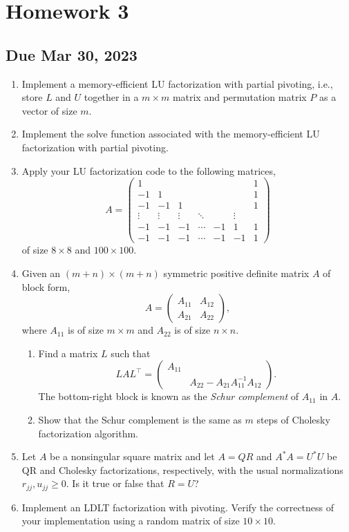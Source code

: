 \section{Homework 3}
\subsection*{Due Mar 30, 2023}
\begin{enumerate}[label=\textbf{Problem \arabic*.}]
    \item [20 pt] Implement a memory-efficient LU factorization with partial pivoting, i.e., store \(L\) and \(U\) together in a \(m\times m\) matrix and permutation matrix \(P\) as a vector of size \(m\).
    \item [10 pt] Implement the solve function associated with the memory-efficient LU factorization with partial pivoting.
    \item [5 pt] Apply your LU factorization code to the following matrices,
    \[A=\begin{pmatrix}1&&&&&&1\\ -1&1&&&&&1\\ -1&-1&1&&&&1\\ \vdots&\vdots&\vdots&\ddots&&\vdots\\ -1&-1&-1&\cdots&-1&1&1\\ -1&-1&-1&\cdots&-1&-1&1\end{pmatrix}\]
    of size \(8\times 8\) and \(100\times 100\).
    \item [20 pt] Given an \((m+n)\times(m+n)\) symmetric positive definite matrix \(A\) of block form,
    \[A=\begin{pmatrix}A_{11}&A_{12}\\ A_{21}&A_{22}\end{pmatrix},\]
    where \(A_{11}\) is of size \(m\times m\) and \(A_{22}\) is of size \(n\times n\).
    \begin{enumerate}
        \item Find a matrix \(L\) such that
        \[LAL^{\top}=\begin{pmatrix}A_{11}&\\ &A_{22}-A_{21}A_{11}^{-1}A_{12}\end{pmatrix}.\]
        The bottom-right block is known as the \textit{Schur complement} of \(A_{11}\) in \(A\).
        \item Show that the Schur complement is the same as \(m\) steps of Cholesky factorization algorithm.
    \end{enumerate}
    \item [10 pt] Let \(A\) be a nonsingular square matrix and let \(A=QR\) and \(A^{*}A=U^{*}U\) be QR and Cholesky factorizations, respectively, with the usual normalizations \(r_{jj},u_{jj}\geq 0\). Is it true or false that \(R=U\)?
    \item [20 pt] Implement an LDLT factorization with pivoting. Verify the correctness of your implementation using a random matrix of size \(10\times 10\).
\end{enumerate}


